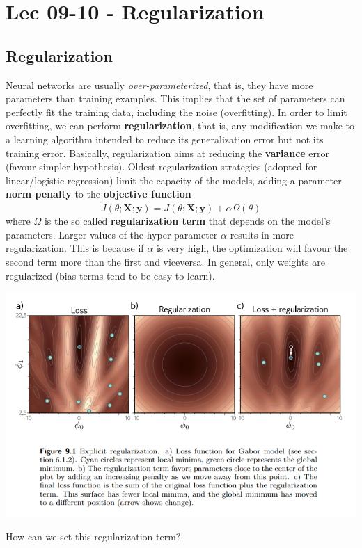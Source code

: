 \chapter{Lec 09-10 - Regularization}

\section{Regularization}
Neural networks are usually \textit{over-parameterized}, that is, they have more parameters than training examples. This implies that the set of parameters can perfectly fit the training data, including the noise (overfitting). In order to limit overfitting, we can perform \textbf{regularization}, that is, any modification we make to a learning algorithm intended to reduce its generalization error but not its training error. Basically, regularization aims at reducing the \textbf{variance} error (favour simpler hypothesis).\newline\newline
Oldest regularization strategies (adopted for linear/logistic regression) limit the capacity of the models, adding a parameter \textbf{norm penalty} to the \textbf{objective function}
\[\tilde{J}(\theta; \textbf{X}; \textbf{y}) = J(\theta; \textbf{X}; \textbf{y}) + \alpha \Omega(\theta)\]
where $\Omega$ is the so called \textbf{regularization term} that depends on the model's parameters. Larger values of the hyper-parameter $\alpha$ results in more regularization. This is because if $\alpha$ is very high, the optimization will favour the second term more than the first and viceversa. In general, only weights are regularized (bias terms tend to be easy to learn).
\begin{center}
    \includegraphics[]{images/Reg.png}
\end{center}
How can we set this regularization term?

